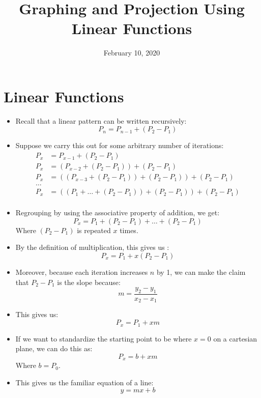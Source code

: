 \documentclass{article}
\title{Graphing and Projection Using Linear Functions}
\date{February 10, 2020}
\begin{document}
\maketitle

\section*{Linear Functions}
\begin{itemize}
    \item Recall that a linear pattern can be written recursively:
	\[
	P_n = P_{n-1} + (P_2 - P_1)
	\]

    \item Suppose we carry this out for some arbitrary number of iterations:
    \begin{align*}
    P_x &= P_{x-1} + (P_2 - P_1) \\
    P_x &= (P_{x-2} + (P_2 - P_1)) + (P_2 - P_1) \\
    P_x &= ((P_{x-3} + (P_2 - P_1)) + (P_2 - P_1)) + (P_2 - P_1) \\
    \ldots &\\
    P_x &= ((P_1 + \ldots + (P_2 - P_1)) + (P_2 - P_1)) + (P_2 - P_1) \\
    \end{align*} 

    \item Regrouping by using the associative property of addition, we get:
    \[
    P_x = P_1 + (P_2 - P_1) + \ldots + (P_2 - P_1)
    \]
    Where $(P_2 - P_1)$ is repeated $x$ times.  

    \item By the definition of multiplication, this gives us :
    \[
    P_x = P_1 + x(P_2 - P_1)
    \]

    \item Moreover, because each iteration increases $n$ by 1, we can make the
    claim that $P_2 - P_1$ is the slope because:
    \[
        m = \displaystyle\frac{y_2 - y_1} {x_2 - x_1}
    \]

    \item This gives us:
    \[
    P_x = P_1 + xm
    \]

    \item If we want to standardize the starting point to be where $x=0$ on
        a cartesian plane, we can do this as:
        \[
        P_x = b + xm
        \]
        Where $b=P_0$.
    \item This gives us the familiar equation of a line:
        \[
        \boxed{y = mx + b}
        \]


\end{itemize}
\end{document}

